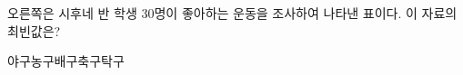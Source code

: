 \noindent\begin{minipage}[t]{0.58\linewidth}\vspace{0pt}\raggedright 오른쪽은 시후네 반 학생 $30$명이 좋아하는 운동을 조사하여 나타낸 표이다. 이 자료의 최빈값은?\end{minipage}\hfill\begin{minipage}[t]{0.4\linewidth}\vspace{0pt}\centering \resizebox{\ifdim\width>\linewidth\linewidth\else\width\fi}{!}{}\end{minipage}\par
\begin{choicesii}{야구}{농구}{배구}{축구}{탁구}\end{choicesii}
